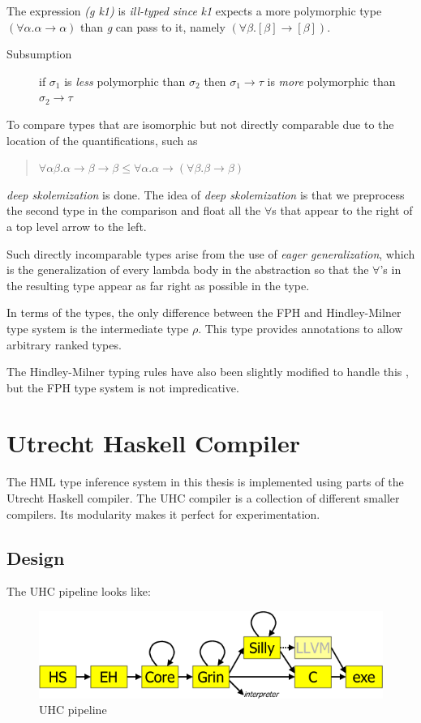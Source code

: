 \documentclass[twoside, titlepage, openright, a4paper]{book}
\renewcommand{\leq}{\leqslant}
\begin{document}
The expression \textit{(g k1)} is \textit{ill-typed since} \textit{k1} expects a more polymorphic type $(\forall\alpha. \alpha \rightarrow \alpha)$ than \emph{g} can pass to it, namely $(\forall\beta.[\beta] \rightarrow [\beta])$. 

\begin{description}
\item[Subsumption] if $\sigma_1$ is \textit{less} polymorphic than $\sigma_2$ then $\sigma_1 \rightarrow \tau$ is \textit{more} polymorphic than $\sigma_2 \rightarrow \tau$
\end{description}

To compare types that are isomorphic but not directly comparable due to the location of the quantifications, such as
\begin{quotation}
$\forall\alpha\beta.\alpha\rightarrow\beta\rightarrow\beta\leq\forall\alpha.\alpha\rightarrow(\forall\beta.\beta\rightarrow\beta)$
\end{quotation}

\textit{deep skolemization} is done. The idea of \textit{deep skolemization} is that we preprocess the second type in the comparison and float all the $\forall$s that appear to the right of a top level arrow to the left.

Such directly incomparable types arise from the use of \textit{eager generalization}, which is the generalization of every lambda body in the abstraction so that the $\forall$'s in the resulting type appear as far right as possible in the type.

In terms of the types, the only difference between the FPH and Hindley-Milner type system is the intermediate type $\rho$. This type provides annotations to allow arbitrary ranked types.

The Hindley-Milner typing rules have also been slightly modified to handle this , but the FPH type system is not impredicative.

\chapter{Utrecht Haskell Compiler}
The HML type inference system in this thesis is implemented using parts of the Utrecht Haskell compiler. The UHC compiler is a collection of different smaller  compilers. Its modularity makes it perfect for experimentation.
\section{Design}
The UHC pipeline looks like:
\begin{figure}[H]
\includegraphics[scale=0.8]{ehc-dataflow2}
\caption{UHC pipeline}
\label{flow}
\end{figure}
\end{document}
